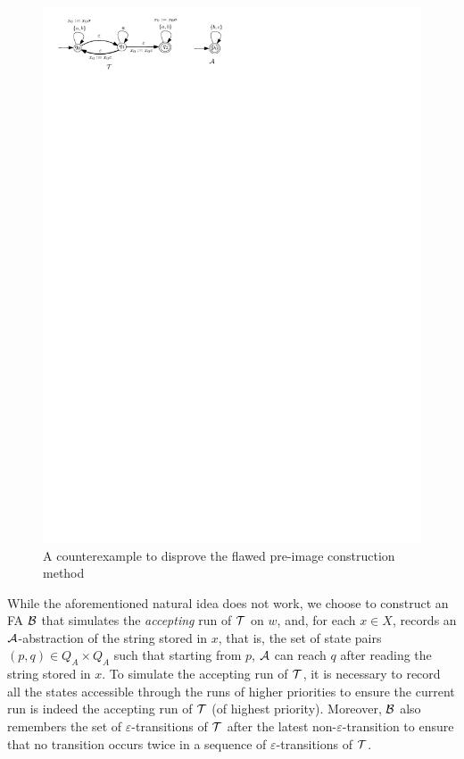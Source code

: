 {\begin{figure}[ht]
\centering
\includegraphics[scale=0.8]{pre-image-counter-example.pdf}
\caption{A counterexample to disprove the flawed pre-image construction method}
\label{fig-pre-image-count-exmp}
\end{figure}
}



While the aforementioned natural idea does not work,  we choose to construct an FA $\mathcal{B}$ that simulates the \emph{accepting} run of $\mathcal{T}$ on $w$, and, for each $x \in X$, records an $\mathcal{A}$-abstraction of the string stored in $x$, that is, the set of state pairs $(p, q) \in Q_A \times Q_A$ such that starting from $p$, $\mathcal{A}$ can reach $q$ after reading the string stored in $x$. 
To simulate the accepting run of $\mathcal{T}$, it is necessary to record all the states accessible through the runs of higher priorities to ensure the current run is indeed the accepting run of $\mathcal{T}$ (of highest priority). Moreover, $\mathcal{B}$ also remembers the set of $\varepsilon$-transitions of $\mathcal{T}$ after the latest non-$\varepsilon$-transition to ensure that no transition occurs twice in a sequence of $\varepsilon$-transitions of $\mathcal{T}$.

